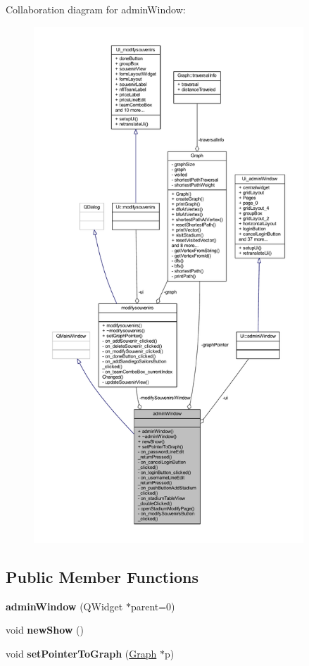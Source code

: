 Collaboration diagram for admin\+Window\+:\nopagebreak
\begin{figure}[H]
\begin{center}
\leavevmode
\includegraphics[height=550pt]{classadmin_window__coll__graph}
\end{center}
\end{figure}
\subsection*{Public Member Functions}
\begin{DoxyCompactItemize}
\item 
\mbox{\label{classadmin_window_aa87a28958c1a314408df44e88c886ac5}} 
{\bfseries admin\+Window} (Q\+Widget $\ast$parent=0)
\item 
\mbox{\label{classadmin_window_a82510bb37f35a28caa9049a127b047fe}} 
void {\bfseries new\+Show} ()
\item 
\mbox{\label{classadmin_window_a0a12fa17f4293753eeb62137c06d7773}} 
void {\bfseries set\+Pointer\+To\+Graph} (\hyperlink{class_graph}{Graph} $\ast$p)
\end{DoxyCompactItemize}

